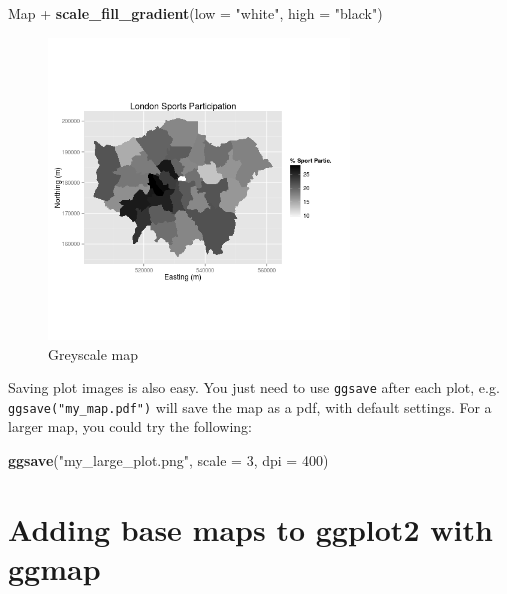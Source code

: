 \documentclass[]{article}
\newenvironment{Shaded}{}{}
\newcommand{\KeywordTok}[1]{\textcolor[rgb]{0.00,0.44,0.13}{\textbf{{#1}}}}
\newcommand{\DataTypeTok}[1]{\textcolor[rgb]{0.56,0.13,0.00}{{#1}}}
\newcommand{\DecValTok}[1]{\textcolor[rgb]{0.25,0.63,0.44}{{#1}}}
\newcommand{\StringTok}[1]{\textcolor[rgb]{0.25,0.44,0.63}{{#1}}}
\newcommand{\NormalTok}[1]{{#1}}
\let\Oldincludegraphics\includegraphics
\renewcommand{\includegraphics}[1]{\Oldincludegraphics[width=8cm]{#1}}
\begin{document}
\begin{Shaded}
\begin{Highlighting}[]
\NormalTok{Map + }\KeywordTok{scale_fill_gradient}\NormalTok{(}\DataTypeTok{low =} \StringTok{"white"}\NormalTok{, }\DataTypeTok{high =} \StringTok{"black"}\NormalTok{)}
\end{Highlighting}
\end{Shaded}
\begin{figure}[htbp]
\centering
\includegraphics{figure/Greyscale_map.png}
\caption{Greyscale map}
\end{figure}

Saving plot images is also easy. You just need to use \texttt{ggsave}
after each plot, e.g. \texttt{ggsave("my\_map.pdf")} will save the map
as a pdf, with default settings. For a larger map, you could try the
following:

\begin{Shaded}
\begin{Highlighting}[]
\KeywordTok{ggsave}\NormalTok{(}\StringTok{"my_large_plot.png"}\NormalTok{, }\DataTypeTok{scale =} \DecValTok{3}\NormalTok{, }\DataTypeTok{dpi =} \DecValTok{400}\NormalTok{)}
\end{Highlighting}
\end{Shaded}
\section{Adding base maps to ggplot2 with ggmap}
\end{document}
